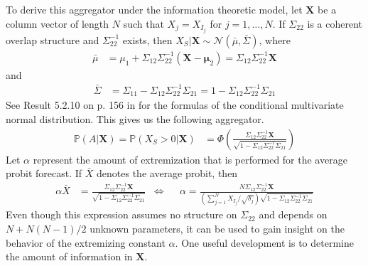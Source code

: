 \documentclass[11pt,twoside]{article}
\renewcommand{\P}{\mathbb{P}}
\begin{document}
To derive this aggregator under the information theoretic model, let $\boldsymbol{X}$ be a column vector of length $N$ such that $X_j = X_{I_j}$ for $j = 1, \dots, N$. If $\Sigma_{22}$ is a coherent overlap structure and $\Sigma_{22}^{-1}$ exists, then $X_{S} | \boldsymbol{X} \sim \mathcal{N}(\bar{\mu}, \bar{\Sigma})$, where
\begin{align}
\bar{\mu} &= \mu_1 + \Sigma_{12} \Sigma_{22}^{-1} (\boldsymbol{X} - \boldsymbol{\mu}_2) =  \Sigma_{12} \Sigma_{22}^{-1} \boldsymbol{X} \label{condMu}
\end{align}
and
\begin{align}
 \bar{\Sigma}&= \Sigma_{11} - \Sigma_{12} \Sigma_{22}^{-1} \Sigma_{21} =1 - \Sigma_{12} \Sigma_{22}^{-1} \Sigma_{21}  \label{condSigma}
\end{align}
See Result 5.2.10 on p. 156 in \cite{ravishanker2001first} for the formulas of the conditional multivariate normal distribution. This gives us the following aggregator. 
\begin{align*}
\P\left(A  | \boldsymbol{X}\right)  = \P\left(X_{S} > 0 | \boldsymbol{X}\right) &= \Phi\left( \frac{\Sigma_{12} \Sigma_{22}^{-1} \boldsymbol{X}}{\sqrt{1 - \Sigma_{12} \Sigma_{22}^{-1} \Sigma_{21}}}\right)
\end{align*}
Let $\alpha$ represent the amount of extremization that is performed for the average probit forecast. If $\bar{X}$ denotes the average probit, then
\begin{align}
\alpha \bar{X}&=  \frac{\Sigma_{12} \Sigma_{22}^{-1} \boldsymbol{X}}{\sqrt{1 - \Sigma_{12} \Sigma_{22}^{-1} \Sigma_{21}}}  &\Leftrightarrow&& \alpha  = \frac{N \Sigma_{12} \Sigma_{22}^{-1} \boldsymbol{X}}{\left( \sum_{j=1}^N X_{I_j} / \sqrt{\delta_j} \right)   \sqrt{1 - \Sigma_{12} \Sigma_{22}^{-1} \Sigma_{21}}} \label{alpha}
\end{align}
Even though this expression assumes no structure on $\Sigma_{22}$ and depends on $N +N(N-1)/2$ unknown parameters, it can be used to gain insight on the behavior of the extremizing constant $\alpha$. One useful development is to determine the amount of information in $\boldsymbol{X}$. 
\end{document}
